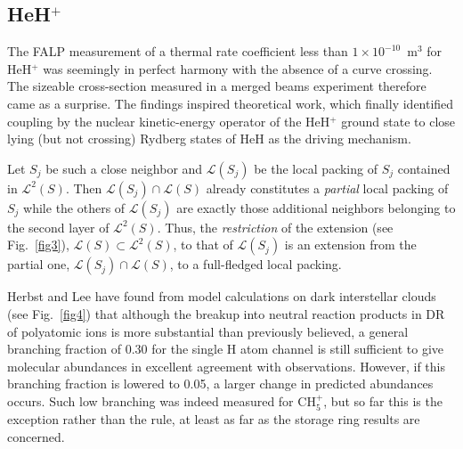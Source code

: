 \documentclass{ws-rv9x6}
\begin{document}
\begin{sidewaysfigure}		%
\centerline{}
\caption{Change in pattern of financial sources of  
fixed shares investment. Time-series differences in average weekly 
returns between B and A shares.\label{fig3}} 
\end{sidewaysfigure}

\begin{sidewaysfigure}		%
\centerline{}
\caption{The aggregate demand for car models. \label{fig4}} 
\end{sidewaysfigure}

\subsection{HeH$^{+}$}

The FALP measurement\cite{38} of a thermal rate coefficient less than 
$1 \times 10^{-10}$~m$^3$ for HeH$^+$ was seemingly in
perfect harmony with the absence of a curve crossing. The sizeable
cross-section measured in a merged beams experiment therefore
came as a surprise. The findings inspired theoretical
work,\cite{40,41} which finally identified coupling by the nuclear
kinetic-energy\break
operator of the HeH$^+$ ground state to close lying
(but not crossing) Rydberg states of HeH as the driving mechanism.

Let $S_j$ be such a close neighbor and
${\mathcal L} (S_j)$ be the local packing of $S_j$ contained in
${\mathcal L}^2 (S)$. Then ${\mathcal L} (S_j) \cap {\mathcal L} (S)$
already constitutes a {\it partial\/} local packing of $S_j$ while the
others of ${\mathcal L} (S_j)$ are exactly those additional neighbors
belonging to the second layer of ${\mathcal L}^2 (S)$. Thus, the {\it
restriction\/} of the extension (see Fig.~\ref{fig3}), 
${\mathcal L} (S) \subset {\mathcal L}^2 (S)$, 
to that of ${\mathcal L} (S_j)$ is an extension from the 
partial one, ${\mathcal L} (S_j) \cap {\mathcal L} (S)$, to a
full-fledged local packing.

Herbst and Lee\cite{21} have found from model calculations on dark
interstellar clouds (see Fig.~\ref{fig4}) that although the breakup into
neutral reaction products in DR of polyatomic ions is more substantial
than previously believed, a general branching fraction of 0.30 for the
single H atom channel is still sufficient to give molecular abundances
in excellent agreement with observations. However, if this branching
fraction is lowered to 0.05, a larger change in predicted abundances
occurs. Such low branching was indeed measured for CH$_5^+$, but so
far this is the exception rather than the rule, at least as far as the
storage ring results are concerned.
\end{document}
